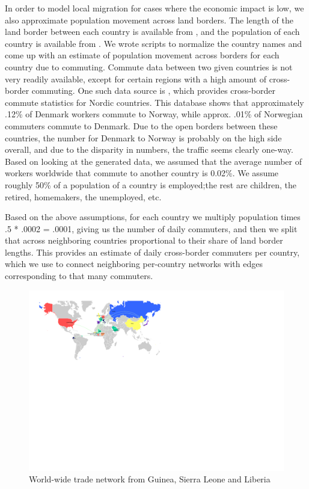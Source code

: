 \documentclass[10pt, journal,onecolumn]{IEEEtran}
\begin{document}
In order to model local migration for cases where the economic impact is low,
we also approximate population movement across land borders.
The length of the land border between each country is available from
\citep{cialandboundaries}, and the population of each country is available from \citep{ciapopulation}.
We wrote scripts to normalize the country names and come up with an estimate of population movement
across borders for each country due to commuting. Commute data between two given countries is not very
readily available, except for certain regions with a high amount of cross-border commuting.
One such data source is \citep{statnord}, which provides cross-border commute statistics for Nordic countries.
This database shows that approximately .12\% of Denmark workers commute to Norway, while approx. .01\% of
Norwegian commuters commute to Denmark. Due to the open borders between these countries, the number for
Denmark to Norway is probably on the high side overall, and due to the disparity in numbers, the traffic seems
clearly one-way. Based on looking at the generated data, we assumed that the average number of workers worldwide
that commute to another country is 0.02\%.
We assume roughly 50\% of a population of a country is employed;the rest are
children, the retired, homemakers, the unemployed, etc.

Based on the above assumptions, for each country we multiply population times .5 * .0002
= .0001, giving us the number of daily commuters, and then we split that across neighboring
countries proportional to their share of land border lengths. This provides an estimate
of daily cross-border commuters per country, which we use to connect neighboring per-country
networks with edges corresponding to that many commuters.


\begin{figure}[ht]
\centering
\includegraphics[scale=.9]{world1.pdf}
\caption{World-wide trade network from Guinea, Sierra Leone and Liberia}
\label{Fig:worldtrade}
\end{figure}
\end{document}
